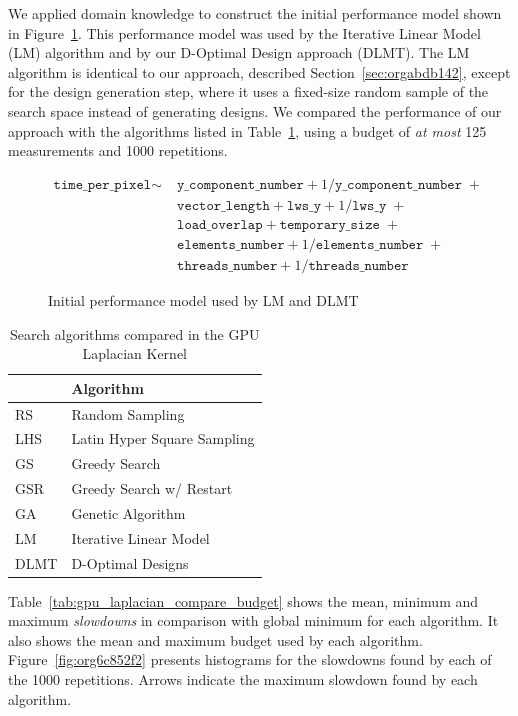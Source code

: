 \documentclass[conference]{IEEEtran}
\begin{document}
We applied domain knowledge to construct the initial performance model shown in
Figure~\ref{fig:gpu_laplacian_performance_model}. This performance model
was used by the Iterative Linear Model (LM) algorithm and by our D-Optimal
Design approach (DLMT). The LM algorithm is identical to our approach, described
Section~\ref{sec:orgabdb142}, except for the design
generation step, where it uses a fixed-size random sample of the search space
instead of generating designs. We compared the performance of our approach with
the algorithms listed in Table~\ref{tab:org05d0f4d}, using a
budget of \emph{at most} 125 measurements and 1000 repetitions.

\begin{figure}
{\scriptsize
\begin{align*}
\texttt{time\_per\_pixel} \sim & \; \texttt{y\_component\_number} + 1 / \texttt{y\_component\_number} \; + \\
& \; \texttt{vector\_length} + \texttt{lws\_y} + 1 / \texttt{lws\_y} \; + \\
& \; \texttt{load\_overlap} + \texttt{temporary\_size} \; + \\
& \; \texttt{elements\_number} + 1 / \texttt{elements\_number} \; + \\
& \; \texttt{threads\_number} + 1 /\texttt{threads\_number}
\end{align*}
}
\caption{Initial performance model used by LM and DLMT}
\label{fig:gpu_laplacian_performance_model}
\end{figure}

\begin{table}[ht]
\caption{\label{tab:org05d0f4d}
Search algorithms compared in the GPU Laplacian Kernel}
\centering
\footnotesize
\begin{tabular}{ll}
\toprule
 & Algorithm\\
\midrule
RS & Random Sampling\\
LHS & Latin Hyper Square Sampling\\
GS & Greedy Search\\
GSR & Greedy Search w/ Restart\\
GA & Genetic Algorithm\\
LM & Iterative Linear Model\\
DLMT & D-Optimal Designs\\
\bottomrule
\end{tabular}
\end{table}

Table~\ref{tab:gpu_laplacian_compare_budget} shows
the mean, minimum and maximum \emph{slowdowns} in comparison with global minimum
for each algorithm. It also shows the mean and maximum budget used by
each algorithm. Figure~\ref{fig:org6c852f2} presents
histograms for the slowdowns found by each of the 1000 repetitions. Arrows
indicate the maximum slowdown found by each algorithm.
\end{document}
